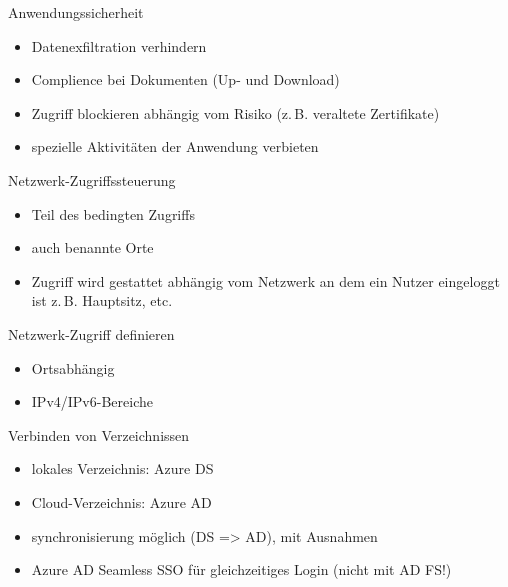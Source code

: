 \begin{flashcard}[Definition]{Anwendungssicherheit}
  \begin{itemize}
    \item Datenexfiltration verhindern
    \item Complience bei Dokumenten (Up- und Download)
    \item Zugriff blockieren abhängig vom Risiko (z.\,B. veraltete Zertifikate)
    \item spezielle Aktivitäten der Anwendung verbieten
  \end{itemize}
\end{flashcard}


\begin{flashcard}[Definition]{Netzwerk-Zugriffssteuerung}
  \begin{itemize}
    \item Teil des bedingten Zugriffs
    \item auch benannte Orte
    \item Zugriff wird gestattet abhängig vom Netzwerk an dem ein Nutzer eingeloggt ist\newline
      z.\,B. Hauptsitz, etc.
  \end{itemize}
\end{flashcard}

\begin{flashcard}[Definition]{Netzwerk-Zugriff definieren}
  \begin{itemize}
    \item Ortsabhängig
    \item IPv4/IPv6-Bereiche
  \end{itemize}
\end{flashcard}


\begin{flashcard}[Definition]{Verbinden von Verzeichnissen}
  \begin{itemize}
    \item lokales Verzeichnis: Azure DS
    \item Cloud-Verzeichnis: Azure AD
    \item synchronisierung möglich (DS => AD), mit Ausnahmen
    \item Azure AD Seamless SSO für gleichzeitiges Login (nicht mit AD FS!)
  \end{itemize}
\end{flashcard}

